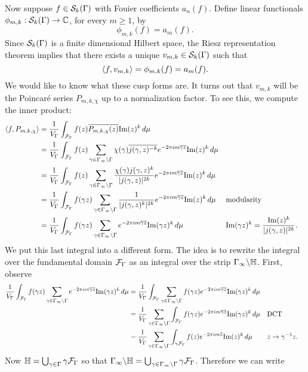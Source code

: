       Now suppose $f \in \mathcal{S}_{k}(\Gamma)$ with Fouier coefficients $a_{n}(f)$. Define linear functionals $\phi_{m,k}:\mathcal{S}_{k}(\Gamma) \to \mathbb{C}$, for every $m \ge 1$, by
      \[
        \phi_{m,k}(f) = a_{m}(f).
      \]
      Since $\mathcal{S}_{k}(\Gamma)$ is a finite dimensional Hilbert space, the Riesz representation theorem implies that there exists a unique $v_{m,k} \in \mathcal{S}_{k}(\Gamma)$ such that
      \[
        \langle f,v_{m,k}\rangle = \phi_{m,k}(f) = a_{m}(f).
      \]
      We would like to know what these cusp forms are. It turns out that $v_{m,k}$ will be the Poincar\'e series $P_{m,k,\chi}$ up to a normalization factor. To see this, we compute the inner product:
      \begin{align*}
        \langle f,P_{m,k,\chi}\rangle &= \frac{1}{V_{\Gamma}}\int_{\mathcal{F}_{\Gamma}}f(z)\overline{P_{m,k,\chi}(z)}\mathrm{Im}(z)^{k}\,d\mu \\
        &= \frac{1}{V_{\Gamma}}\int_{\mathcal{F}_{\Gamma}}f(z)\sum_{\gamma \in \Gamma_{\infty}\backslash\Gamma}\chi(\gamma)\overline{j(\gamma,z)^{-k}}e^{-2\pi im\overline{\gamma z}}\mathrm{Im}(z)^{k}\,d\mu \\
        &= \frac{1}{V_{\Gamma}}\int_{\mathcal{F}_{\Gamma}}f(z)\sum_{\gamma \in \Gamma_{\infty}\backslash\Gamma}\frac{\chi(\gamma)j(\gamma,z)^{k}}{|j(\gamma,z)|^{2k}}e^{-2\pi im\overline{\gamma z}}\mathrm{Im}(z)^{k}\,d\mu \\
        &= \frac{1}{V_{\Gamma}}\int_{\mathcal{F}_{\Gamma}}f(\gamma z)\sum_{\gamma \in \Gamma_{\infty}\backslash\Gamma}\frac{1}{|j(\gamma,z)^{k}|^{2k}}e^{-2\pi im\overline{\gamma z}}\mathrm{Im}(z)^{k}\,d\mu && \text{modularity} \\
        &= \frac{1}{V_{\Gamma}}\int_{\mathcal{F}_{\Gamma}}f(\gamma z)\sum_{\gamma \in \Gamma_{\infty}\backslash\Gamma}e^{-2\pi im\overline{\gamma z}}\mathrm{Im}(\gamma z)^{k}\,d\mu && \text{$\mathrm{Im}(\gamma z)^{k} = \frac{\mathrm{Im}(z)^{k}}{|j(\gamma,z)|^{2k}}$.}
      \end{align*}
      We put this last integral into a different form. The idea is to rewrite the integral over the fundamental domain $\mathcal{F}_{\Gamma}$ as an integral over the strip $\Gamma_{\infty}\backslash\mathbb{H}$. First, observe
      \begin{align*}
        \frac{1}{V_{\Gamma}}\int_{\mathcal{F}_{\Gamma}}f(\gamma z)\sum_{\gamma \in \Gamma_{\infty}\backslash\Gamma}e^{-2\pi im\overline{\gamma z}}\mathrm{Im}(\gamma z)^{k}\,d\mu &= \frac{1}{V_{\Gamma}}\int_{\mathcal{F}_{\Gamma}}\sum_{\gamma \in \Gamma_{\infty}\backslash\Gamma}f(\gamma z)e^{-2\pi im\overline{\gamma z}}\mathrm{Im}(\gamma z)^{k}\,d\mu \\
        &= \frac{1}{V_{\Gamma}}\sum_{\gamma \in \Gamma_{\infty}\backslash\Gamma}\int_{\mathcal{F}_{\Gamma}}f(\gamma z)e^{-2\pi im\overline{\gamma z}}\mathrm{Im}(\gamma z)^{k}\,d\mu && \text{DCT} \\
        &= \frac{1}{V_{\Gamma}}\sum_{\gamma \in \Gamma_{\infty}\backslash\Gamma}\int_{\gamma\mathcal{F}_{\Gamma}}f(z)e^{-2\pi im\overline{z}}\mathrm{Im}(z)^{k}\,d\mu && \text{$z \to \gamma^{-1}z$.}
      \end{align*}
      Now $\mathbb{H} = \bigcup_{\gamma \in \Gamma}\gamma\mathcal{F}_{\Gamma}$ so that $\Gamma_{\infty}\backslash\mathbb{H} = \bigcup_{\gamma \in \Gamma_{\infty}\backslash\Gamma}\gamma\mathcal{F}_{\Gamma}$. Therefore we can write
